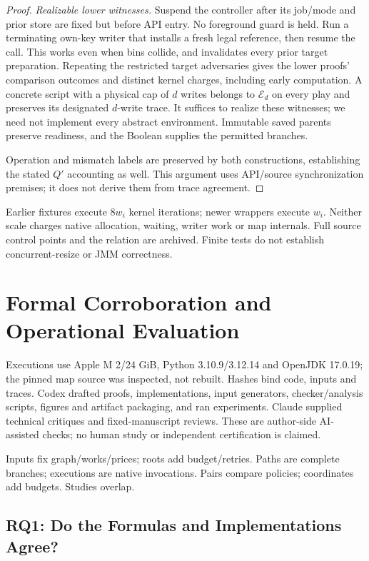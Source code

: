 \documentclass[acmsmall,screen,review,anonymous]{acmart}
\begin{document}
\begin{proof}
\emph{Realizable lower witnesses.} Suspend the controller after its job/mode and prior store are fixed but before API entry. No foreground guard is held. Run a terminating own-key writer that installs a fresh legal reference, then resume the call. This works even when bins collide, and invalidates every prior target preparation. Repeating the restricted target adversaries gives the lower proofs' comparison outcomes and distinct kernel charges, including early computation. A concrete script with a physical cap of $d$ writes belongs to $\mathcal E_d$ on every play and preserves its designated $d$-write trace. It suffices to realize these witnesses; we need not implement every abstract environment. Immutable saved parents preserve readiness, and the Boolean supplies the permitted branches.

Operation and mismatch labels are preserved by both constructions, establishing the stated $Q'$ accounting as well. This argument uses API/source synchronization premises; it does not derive them from trace agreement.
\end{proof}

Earlier fixtures execute $8w_i$ kernel iterations; newer wrappers execute $w_i$. Neither scale charges native allocation, waiting, writer work or map internals. Full source control points and the relation are archived. Finite tests do not establish concurrent-resize or JMM correctness.

\section{Formal Corroboration and Operational Evaluation}
\label{sec:eval}

Executions use Apple M 2/24 GiB, Python 3.10.9/3.12.14 and OpenJDK 17.0.19; the pinned map source was inspected, not rebuilt. Hashes bind code, inputs and traces. Codex drafted proofs, implementations, input generators, checker/analysis scripts, figures and artifact packaging, and ran experiments. Claude supplied technical critiques and fixed-manuscript reviews. These are author-side AI-assisted checks; no human study or independent certification is claimed.

Inputs fix graph/works/prices; roots add budget/retries. Paths are complete branches; executions are native invocations. Pairs compare policies; coordinates add budgets. Studies overlap.

\subsection{RQ1: Do the Formulas and Implementations Agree?}
\end{document}
